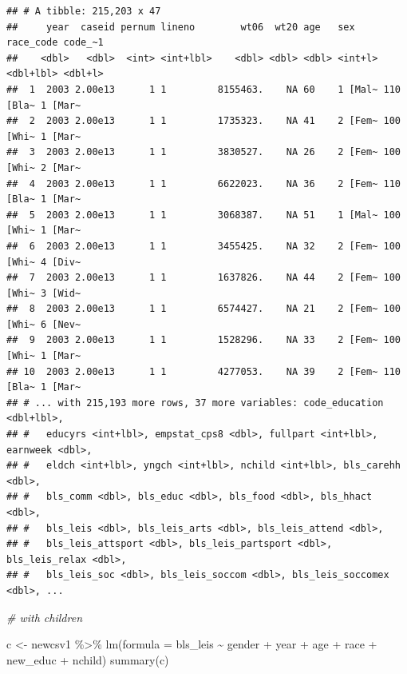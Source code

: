 \documentclass[
]{article}
\newenvironment{Shaded}{\begin{snugshade}}{\end{snugshade}}
\newcommand{\AttributeTok}[1]{\textcolor[rgb]{0.77,0.63,0.00}{#1}}
\newcommand{\CommentTok}[1]{\textcolor[rgb]{0.56,0.35,0.01}{\textit{#1}}}
\newcommand{\FunctionTok}[1]{\textcolor[rgb]{0.00,0.00,0.00}{#1}}
\newcommand{\NormalTok}[1]{#1}
\newcommand{\OtherTok}[1]{\textcolor[rgb]{0.56,0.35,0.01}{#1}}
\newcommand{\SpecialCharTok}[1]{\textcolor[rgb]{0.00,0.00,0.00}{#1}}
\begin{document}
\begin{verbatim}
## # A tibble: 215,203 x 47
##     year  caseid pernum lineno        wt06  wt20 age   sex     race_code code_~1
##    <dbl>   <dbl>  <int> <int+lbl>    <dbl> <dbl> <dbl> <int+l> <dbl+lbl> <dbl+l>
##  1  2003 2.00e13      1 1         8155463.    NA 60    1 [Mal~ 110 [Bla~ 1 [Mar~
##  2  2003 2.00e13      1 1         1735323.    NA 41    2 [Fem~ 100 [Whi~ 1 [Mar~
##  3  2003 2.00e13      1 1         3830527.    NA 26    2 [Fem~ 100 [Whi~ 2 [Mar~
##  4  2003 2.00e13      1 1         6622023.    NA 36    2 [Fem~ 110 [Bla~ 1 [Mar~
##  5  2003 2.00e13      1 1         3068387.    NA 51    1 [Mal~ 100 [Whi~ 1 [Mar~
##  6  2003 2.00e13      1 1         3455425.    NA 32    2 [Fem~ 100 [Whi~ 4 [Div~
##  7  2003 2.00e13      1 1         1637826.    NA 44    2 [Fem~ 100 [Whi~ 3 [Wid~
##  8  2003 2.00e13      1 1         6574427.    NA 21    2 [Fem~ 100 [Whi~ 6 [Nev~
##  9  2003 2.00e13      1 1         1528296.    NA 33    2 [Fem~ 100 [Whi~ 1 [Mar~
## 10  2003 2.00e13      1 1         4277053.    NA 39    2 [Fem~ 110 [Bla~ 1 [Mar~
## # ... with 215,193 more rows, 37 more variables: code_education <dbl+lbl>,
## #   educyrs <int+lbl>, empstat_cps8 <dbl>, fullpart <int+lbl>, earnweek <dbl>,
## #   eldch <int+lbl>, yngch <int+lbl>, nchild <int+lbl>, bls_carehh <dbl>,
## #   bls_comm <dbl>, bls_educ <dbl>, bls_food <dbl>, bls_hhact <dbl>,
## #   bls_leis <dbl>, bls_leis_arts <dbl>, bls_leis_attend <dbl>,
## #   bls_leis_attsport <dbl>, bls_leis_partsport <dbl>, bls_leis_relax <dbl>,
## #   bls_leis_soc <dbl>, bls_leis_soccom <dbl>, bls_leis_soccomex <dbl>, ...
\end{verbatim}

\begin{Shaded}
\begin{Highlighting}[]
\CommentTok{\# with children}
 

\NormalTok{c }\OtherTok{\textless{}{-}}\NormalTok{ newcsv1 }\SpecialCharTok{\%\textgreater{}\%}
  \FunctionTok{lm}\NormalTok{(}\AttributeTok{formula =}\NormalTok{ bls\_leis }\SpecialCharTok{\textasciitilde{}}\NormalTok{ gender }\SpecialCharTok{+}\NormalTok{ year }\SpecialCharTok{+}\NormalTok{ age }\SpecialCharTok{+}\NormalTok{ race }\SpecialCharTok{+}\NormalTok{ new\_educ }\SpecialCharTok{+}\NormalTok{ nchild) }
\FunctionTok{summary}\NormalTok{(c)}
\end{Highlighting}
\end{Shaded}
\end{document}
